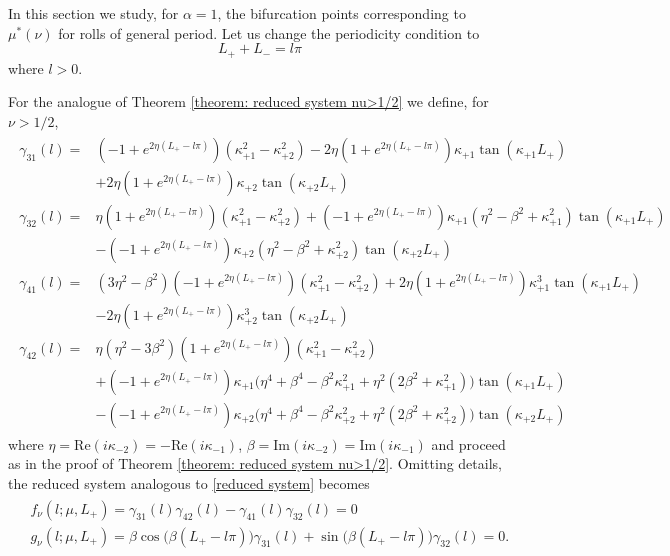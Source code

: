 \documentclass{article}
\numberwithin{equation}{section}
\begin{document}
In this section we study, for $\alpha=1$, the bifurcation points corresponding to $\mu^*(\nu)$ for rolls of general period. Let us change the periodicity condition to
		\begin{equation}
			L_+ + L_- = l \pi
		\end{equation}
where $l>0$. 

For the analogue of Theorem \ref{theorem: reduced system nu>1/2} we define, for $\nu > 1/2$,  
		\begin{align} \label{eq: gammas_l}
			\begin{split}
				\gamma_{31} (l)=& (-1 + e^{2 \eta (L_+ -l \pi)}) (\kappa_{+1}^2 - \kappa_{+2}^2)-2 \eta (1 + e^{2 \eta (L_+ -l \pi)}) \kappa_{+1} \tan(\kappa_{+1} L_+) \\
				&  +2 \eta (1 + e^{2 \eta (L_+ -l \pi)}) \kappa_{+2} \tan(\kappa_{+2} L_+) \\
				\gamma_{32} (l) =& \eta (1 + e^{2 \eta (L_+ -l \pi)}) (\kappa_{+1}^2 - \kappa_{+2}^2) + (-1 + e^{2 \eta (L_+ -l \pi)}) \kappa_{+1} (\eta^2 - \beta^2 + \kappa_{+1}^2) \tan(\kappa_{+1} L_+) \\
				& - (-1 + e^{2 \eta (L_+ -l \pi)}) \kappa_{+2} (\eta^2 - \beta^2 + \kappa_{+2}^2) \tan(\kappa_{+2} L_+) \\
				\gamma_{41} (l) =& (3 \eta^2 - \beta^2)(-1 + e^{2 \eta (L_+ -l \pi)})(\kappa_{+1}^2 - \kappa_{+2}^2) +2 \eta (1 + e^{2 \eta (L_+ -l \pi)}) \kappa_{+1}^3 \tan(\kappa_{+1} L_+) \\
				& -2 \eta (1 + e^{2 \eta (L_+ -l \pi)}) \kappa_{+2}^3 \tan(\kappa_{+2} L_+) \\
				\gamma_{42} (l)=& \eta (\eta^2 -3\beta^2) (1 + e^{2 \eta (L_+ -l \pi)}) (\kappa_{+1}^2 - \kappa_{+2}^2) \\
				& + (-1 + e^{2 \eta (L_+ -l \pi)}) \kappa_{+1} \big( \eta^4 + \beta^4 -\beta^2 \kappa_{+1}^2 + \eta^2 (2\beta^2 + \kappa_{+1}^2) \big) \tan(\kappa_{+1} L_+) \\
				& - (-1 + e^{2 \eta (L_+ -l \pi)}) \kappa_{+2} \big( \eta^4 + \beta^4 -\beta^2 \kappa_{+2}^2 + \eta^2 (2\beta^2 + \kappa_{+2}^2) \big) \tan(\kappa_{+2} L_+)
			\end{split}
		\end{align}
		where $\eta = \mathrm{Re}(i \kappa_{-2}) = -\mathrm{Re} (i \kappa_{-1}) $, $\beta = \mathrm{Im}(i \kappa_{-2}) = \mathrm{Im} (i \kappa_{-1})$
and proceed as in the proof of Theorem \ref{theorem: reduced system nu>1/2}. Omitting details, the reduced system analogous to \eqref{reduced system} becomes 
		\begin{align}\label{e:reduced_l}
			\begin{split}
				& f_\nu (l; \mu,L_+) =  \gamma_{31}(l) \gamma_{42}(l) - \gamma_{41}(l) \gamma_{32}(l) = 0 \\
				& g_\nu(l; \mu,L_+) =  \beta \cos\big(\beta (L_+ -l \pi)\big) \gamma_{31} (l) + \sin\big(\beta (L_+ - l \pi)\big) \gamma_{32} (l) = 0.
			\end{split}
		\end{align} 
\end{document}
